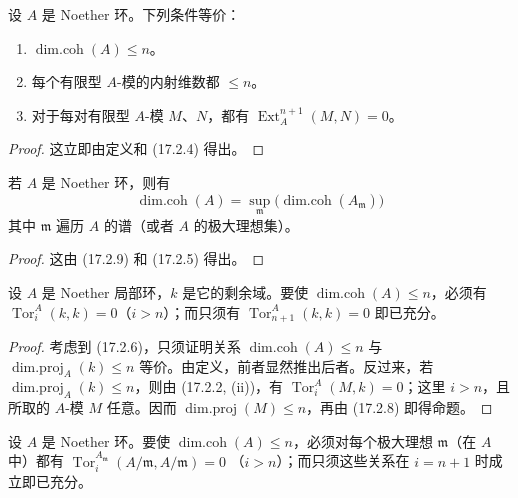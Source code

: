 \begin{proposition}[17.2.9]
\label{0.17.2.9-fr}
设 $A$ 是 Noether 环。下列条件等价：
\begin{enumerate}
  \item[\rm a)] $\operatorname{dim.coh}(A)\leq n$。
  \item[\rm b)] 每个有限型 $A$-模的内射维数都 $\leq n$。
  \item[\rm c)] 对于每对有限型 $A$-模 $M$、$N$，都有
  $\operatorname{Ext}^{n+1}_A(M,N)=0$。
\end{enumerate}
\end{proposition}

\begin{proof}
这立即由定义和 (17.2.4) 得出。
\end{proof}

\begin{corollary}[17.2.10]
\label{0.17.2.10-fr}
若 $A$ 是 Noether 环，则有
\begin{equation}
\label{0.17.2.10.1-fr}
\tag{17.2.10.1}
  \operatorname{dim.coh}(A)
  =\sup_{\mathfrak{m}}
  \bigl(\operatorname{dim.coh}(A_{\mathfrak{m}})\bigr)
\end{equation}
其中 $\mathfrak{m}$ 遍历 $A$ 的谱（或者 $A$ 的极大理想集）。
\end{corollary}

\begin{proof}
这由 (17.2.9) 和 (17.2.5) 得出。
\end{proof}

\begin{proposition}[17.2.11]
\label{0.17.2.11-fr}
设 $A$ 是 Noether 局部环，$k$ 是它的剩余域。要使
$\operatorname{dim.coh}(A)\leq n$，必须有
$\operatorname{Tor}^A_i(k,k)=0$（$i>n$）；而只须有
$\operatorname{Tor}^A_{n+1}(k,k)=0$ 即已充分。
\end{proposition}

\begin{proof}
考虑到 (17.2.6)，只须证明关系
$\operatorname{dim.coh}(A)\leq n$ 与
$\operatorname{dim.proj}_A(k)\leq n$ 等价。由定义，前者显然推出后者。反过来，若
$\operatorname{dim.proj}_A(k)\leq n$，则由 (17.2.2, (ii))，有
$\operatorname{Tor}^A_i(M,k)=0$；这里 $i>n$，且所取的 $A$-模 $M$ 任意。因而
$\operatorname{dim.proj}(M)\leq n$，再由 (17.2.8) 即得命题。
\end{proof}

\begin{corollary}[17.2.12]
\label{0.17.2.12-fr}
设 $A$ 是 Noether 环。要使
$\operatorname{dim.coh}(A)\leq n$，必须对每个极大理想
$\mathfrak{m}$（在 $A$ 中）都有
$\operatorname{Tor}^{A_{\mathfrak{m}}}_i(A/\mathfrak{m},A/\mathfrak{m})=0$
（$i>n$）；而只须这些关系在 $i=n+1$ 时成立即已充分。
\end{corollary}

